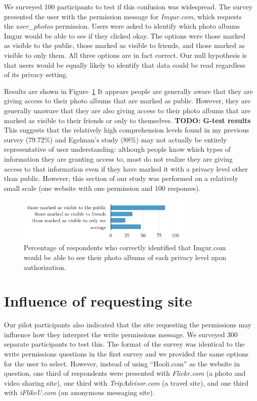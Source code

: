 \documentclass[twoside,letterpaper]{soups-poster}
\begin{document}
We surveyed 100 participants to test if this confusion was widespread. The survey presented the user with the permission message for \emph{Imgur.com}, which requests the \emph{user\_photos} permission. Users were asked to identify which photo albums Imgur would be able to see if they clicked okay. The options were those marked as visible to the public, those marked as visible to friends, and those marked as visible to only them. All three options are in fact correct.
Our null hypothesis is that users would be equally likely to identify that data could be read regardless of its privacy setting.

Results are shown in Figure~\ref{figure:privacypercents}
It appears people are generally aware that they are giving access to their photo albums that are marked as public. However, they are generally unaware that they are also giving access to their photo albums that are marked as visible to their friends or only to themselves.
\textbf{TODO: G-test results}
This suggests that the relatively high comprehension levels found in my previous survey (79.72\%) and Egelman's study (88\%) \cite{egelman} may not actually be entirely representative of user understanding: although people know which types of information they are granting access to, most do not realize they are giving access to that information even if they have marked it with a privacy level other than public. However, this section of our study was performed on a relatively small scale (one website with one permission and 100 responses).

\begin{figure}[h!]
  \centering
  \includegraphics[width=8.5cm]{privacy_percents_cosn}
  \caption{Percentage of respondents who correctly identified that Imgur.com would be able to see their photo albums of each privacy level upon authorization.}
  \label{figure:privacypercents}
\end{figure}

\section{Influence of requesting site}

Our pilot participants also indicated that the site requesting the permissions may influence how they interpret the write permissions message. 
We surveyed 300 separate participants to test this. The format of the survey was identical to the write permissions questions in the first survey and we provided the same options for the user to select. However, instead of using ``Hooli.com'' as the website in question, one third of respondents were presented with \emph{Flickr.com} (a photo and video sharing site), one third with \emph{TripAdvisor.com} (a travel site), and one third with \emph{iFlikeU.com} (an anonymous messaging site).
\end{document}
